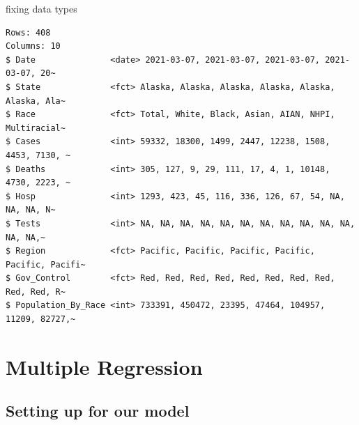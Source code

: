 \documentclass[
  letterpaper,
  DIV=11,
  numbers=noendperiod]{scrartcl}
\newenvironment{Shaded}{\begin{snugshade}}{\end{snugshade}}
\newcommand{\FunctionTok}[1]{\textcolor[rgb]{0.28,0.35,0.67}{#1}}
\newcommand{\NormalTok}[1]{\textcolor[rgb]{0.00,0.23,0.31}{#1}}
\newcommand{\OtherTok}[1]{\textcolor[rgb]{0.00,0.23,0.31}{#1}}
\newcommand{\SpecialCharTok}[1]{\textcolor[rgb]{0.37,0.37,0.37}{#1}}
\begin{document}
fixing data types

\begin{Shaded}
\end{Shaded}

\begin{verbatim}
Rows: 408
Columns: 10
$ Date               <date> 2021-03-07, 2021-03-07, 2021-03-07, 2021-03-07, 20~
$ State              <fct> Alaska, Alaska, Alaska, Alaska, Alaska, Alaska, Ala~
$ Race               <fct> Total, White, Black, Asian, AIAN, NHPI, Multiracial~
$ Cases              <int> 59332, 18300, 1499, 2447, 12238, 1508, 4453, 7130, ~
$ Deaths             <int> 305, 127, 9, 29, 111, 17, 4, 1, 10148, 4730, 2223, ~
$ Hosp               <int> 1293, 423, 45, 116, 336, 126, 67, 54, NA, NA, NA, N~
$ Tests              <int> NA, NA, NA, NA, NA, NA, NA, NA, NA, NA, NA, NA, NA,~
$ Region             <fct> Pacific, Pacific, Pacific, Pacific, Pacific, Pacifi~
$ Gov_Control        <fct> Red, Red, Red, Red, Red, Red, Red, Red, Red, Red, R~
$ Population_By_Race <int> 733391, 450472, 23395, 47464, 104957, 11209, 82727,~
\end{verbatim}

\section{Multiple Regression}\label{multiple-regression}

\subsection{Setting up for our model}\label{setting-up-for-our-model}
\end{document}
